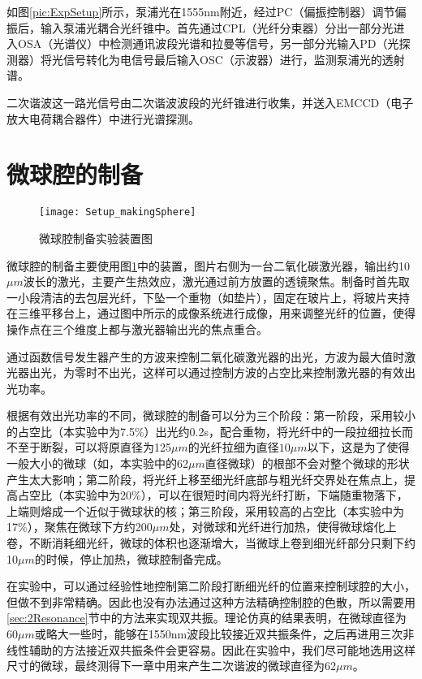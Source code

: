 如图\ref{pic:ExpSetup}所示，泵浦光在1555nm附近，经过PC（偏振控制器）调节偏振后，输入泵浦光耦合光纤锥中。首先通过CPL（光纤分束器）分出一部分光进入OSA（光谱仪）中检测通讯波段光谱和拉曼等信号，另一部分光输入PD（光探测器）将光信号转化为电信号最后输入OSC（示波器）进行，监测泵浦光的透射谱。

二次谐波这一路光信号由二次谐波波段的光纤锥进行收集，并送入EMCCD（电子放大电荷耦合器件）中进行光谱探测。

\section{微球腔的制备}

\begin{figure}
\centering
\texttt{[image: Setup\_makingSphere]}
\caption{微球腔制备实验装置图}
\label{pic:Setup_makingSphere}
\end{figure}

微球腔的制备主要使用图\ref{pic:Setup_makingSphere}中的装置，图片右侧为一台二氧化碳激光器，输出约10$\mu m$波长的激光，主要产生热效应，激光通过前方放置的透镜聚焦。制备时首先取一小段清洁的去包层光纤，下坠一个重物（如垫片），固定在玻片上，将玻片夹持在三维平移台上，通过图中所示的成像系统进行成像，用来调整光纤的位置，使得操作点在三个维度上都与激光器输出光的焦点重合。

通过函数信号发生器产生的方波来控制二氧化碳激光器的出光，方波为最大值时激光器出光，为零时不出光，这样可以通过控制方波的占空比来控制激光器的有效出光功率。

根据有效出光功率的不同，微球腔的制备可以分为三个阶段：第一阶段，采用较小的占空比（本实验中为7.5\%）出光约0.2s，配合重物，将光纤中的一段拉细拉长而不至于断裂，可以将原直径为125$\mu m$的光纤拉细为直径$10\mu m$以下，这是为了使得一般大小的微球（如，本实验中的62$\mu m$直径微球）的根部不会对整个微球的形状产生太大影响；第二阶段，将光纤上移至细光纤底部与粗光纤交界处在焦点上，提高占空比（本实验中为20\%），可以在很短时间内将光纤打断，下端随重物落下，上端则熔成一个近似于微球状的核；第三阶段，采用较高的占空比（本实验中为17\%），聚焦在微球下方约200$\mu m$处，对微球和光纤进行加热，使得微球熔化上卷，不断消耗细光纤，微球的体积也逐渐增大，当微球上卷到细光纤部分只剩下约10$\mu m$的时候，停止加热，微球腔制备完成。

在实验中，可以通过经验性地控制第二阶段打断细光纤的位置来控制球腔的大小，但做不到非常精确。因此也没有办法通过这种方法精确控制腔的色散，所以需要用\ref{sec:2Resonance}节中的方法来实现双共振。理论仿真的结果表明，在微球直径为60$\mu m$或略大一些时，能够在1550nm波段比较接近双共振条件，之后再进用三次非线性辅助的方法接近双共振条件会更容易。因此在实验中，我们尽可能地选用这样尺寸的微球，最终测得下一章中用来产生二次谐波的微球直径为62$\mu m$。


